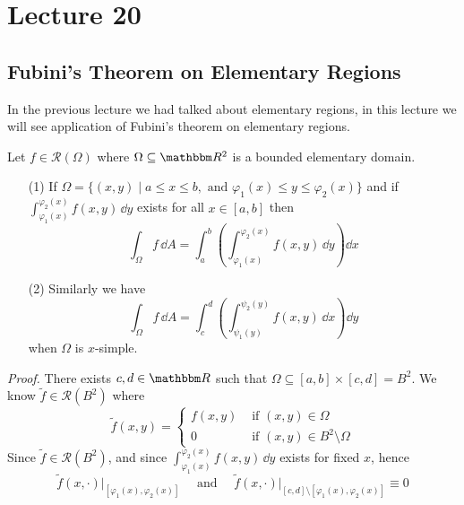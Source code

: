 \documentclass[Analysis-3]{subfiles}
\begin{document}
\chapter*{Lecture 20} %
\setcounter{chapter}{20} %
\setcounter{section}{0}

\section{Fubini's Theorem on Elementary Regions}

In the previous lecture we had talked about elementary regions, in this lecture we will see application of Fubini's theorem on elementary regions. 

\begin{Thm}{}{}\label{thm1:20}
    Let $f \in \mathscr{R}(\Omega)$ where $\Omega \subseteq \R^2$ is a bounded elementary domain. 
    \begin{enumerate}
        \item[(1)] If $\Omega = \{ (x,y) \mid a \leq x \leq b, \mbox{ and } \varphi_1(x) \leq y \leq \varphi_2(x) \}$ and if $\displaystyle{\int_{\varphi_1(x)}^{\varphi_2(x)}f(x,y) \, \dd y}$ exists for all $x \in [a,b]$ then 
        \[
            \int_{\Omega} f \, \dd A = \int_a^b \left( \int_{\varphi_1(x)}^{\varphi_2(x)} f(x,y) \, \dd y\right) \dd x    
        \]

        \item[(2)] Similarly we have 
        \[
            \int_{\Omega} f \, \dd A = \int_c^d \left( \int_{\psi_1(y)}^{\psi_2(y)} f(x,y) \, \dd x\right) \dd y    
        \]
        when $\Omega$ is $x$-simple. 
    \end{enumerate}
\end{Thm}
\textit{Proof.} There exists $c,d \in \R$ such that $\Omega \subseteq [a,b] \times [c,d] = B^2$. We know $\tilde{f} \in \mathscr{R}(B^2)$ where 
\[
    \tilde{f}(x,y) = \begin{cases}
        f(x,y) & \mbox{ if } (x,y) \in \Omega \\ 
        0 & \mbox{ if } (x,y) \in B^2 \setminus \Omega
    \end{cases}    
\]
Since $\tilde{f} \in \mathscr{R}(B^2)$, and since $\displaystyle{\int_{\varphi_1(x)}^{\varphi_2(x)} f(x,y) \, \dd y}$ exists for fixed $x$, hence 
\[
    \tilde{f}(x,\cdot)\big\vert_{[\varphi_1(x),\varphi_2(x)]} \quad \mbox{ and } \quad \tilde{f}(x,\cdot)\big\vert_{[c,d]\setminus[\varphi_1(x),\varphi_2(x)]} \equiv 0    
\]
\end{document}
